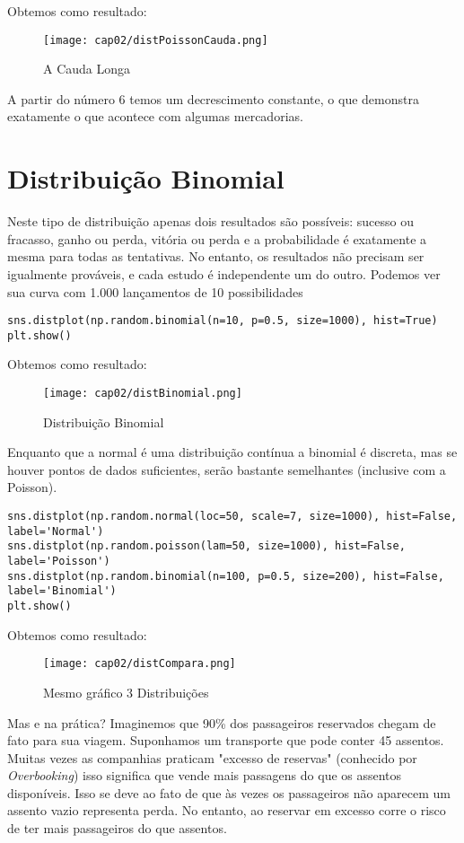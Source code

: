 Obtemos como resultado:
\begin{figure}[H]
	\centering
	\texttt{[image: cap02/distPoissonCauda.png]}
	\caption{A Cauda Longa}
\end{figure}

A partir do número 6 temos um decrescimento constante, o que demonstra exatamente o que acontece com algumas mercadorias.

\section{Distribuição Binomial}
Neste tipo de distribuição apenas dois resultados são possíveis: sucesso ou fracasso, ganho ou perda, vitória ou perda e a probabilidade é exatamente a mesma para todas as tentativas. No entanto, os resultados não precisam ser igualmente prováveis, e cada estudo é independente um do outro. Podemos ver sua curva com 1.000 lançamentos de 10 possibilidades
\begin{lstlisting}[]
sns.distplot(np.random.binomial(n=10, p=0.5, size=1000), hist=True)
plt.show()
\end{lstlisting}

Obtemos como resultado:
\begin{figure}[H]
	\centering
	\texttt{[image: cap02/distBinomial.png]}
	\caption{Distribuição Binomial}
\end{figure}

Enquanto que a normal é uma distribuição contínua a binomial é discreta, mas se houver pontos de dados suficientes, serão bastante semelhantes (inclusive com a Poisson).

\begin{lstlisting}[]
sns.distplot(np.random.normal(loc=50, scale=7, size=1000), hist=False, label='Normal')
sns.distplot(np.random.poisson(lam=50, size=1000), hist=False, label='Poisson')
sns.distplot(np.random.binomial(n=100, p=0.5, size=200), hist=False, label='Binomial')
plt.show()
\end{lstlisting}

Obtemos como resultado:
\begin{figure}[H]
	\centering
	\texttt{[image: cap02/distCompara.png]}
	\caption{Mesmo gráfico 3 Distribuições}
\end{figure}

Mas e na prática? Imaginemos que 90\% dos passageiros reservados chegam de fato para sua viagem. Suponhamos um transporte que pode conter 45 assentos. Muitas vezes as companhias praticam "excesso de reservas" (conhecido por \textit{Overbooking}) isso significa que vende mais passagens do que os assentos disponíveis. Isso se deve ao fato de que às vezes os passageiros não aparecem um assento vazio representa perda. No entanto, ao reservar em excesso corre o risco de ter mais passageiros do que assentos.

